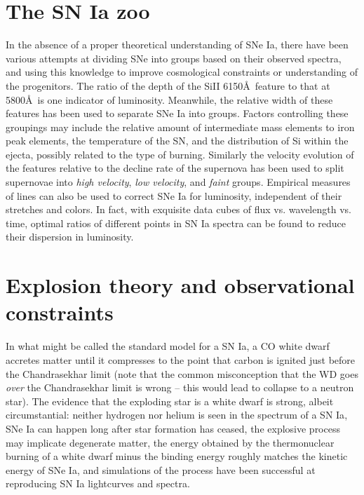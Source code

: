 \documentclass{nature1}
\begin{document}
\section{The SN Ia zoo}
In the absence of a proper theoretical understanding of SNe Ia, there
have been various attempts at dividing SNe into groups based on their
observed spectra, and using this knowledge to improve cosmological
constraints or understanding of the progenitors.  The ratio of the
depth of the SiII 6150\AA\ feature to that at 5800\AA\ is one
indicator of luminosity\citep{1995ApJ...455L.147N}.  Meanwhile, the
relative width of these features has been used to separate SNe Ia into
groups\citep{2009PASP..121..238B}.  Factors controlling these
groupings may include the relative amount of intermediate mass
elements to iron peak elements\citep{2007Sci...315..825M}, the
temperature of the SN\citep{1995ApJ...455L.147N}, and the distribution
of Si within the ejecta, possibly related to the type of
burning\citep{2009Natur.460..869K}.  Similarly the velocity evolution
of the features relative to the decline rate of the supernova has been
used to split supernovae into {\it high velocity}, {\it low velocity},
and {\it faint} groups\citep{2005ApJ...623.1011B}.  Empirical measures
of lines can also be used to correct SNe Ia for luminosity,
independent of their stretches and colors\citep{2008A&A...477..717B}.
In fact, with exquisite data cubes of flux vs. wavelength vs. time,
optimal ratios of different points in SN Ia spectra can be found to
reduce their dispersion in luminosity\citep{2009A&A...500L..17B}.

\section{Explosion theory and observational constraints}
In what might be called the standard model for a SN Ia, a CO white
dwarf accretes matter until it compresses to the point that carbon is
ignited just before the Chandrasekhar limit (note that the common
misconception that the WD goes {\it over} the Chandrasekhar limit is
wrong -- this would lead to collapse to a neutron star).  The evidence
that the exploding star is a white dwarf is strong, albeit
circumstantial\citep{2001sgrb.conf..334L}: neither hydrogen nor helium
is seen in the spectrum of a SN Ia\citep{2007ApJ...670.1275L}, SNe Ia
can happen long after star formation has ceased, the explosive process
may implicate degenerate matter, the energy obtained by the
thermonuclear burning of a white dwarf minus the binding energy
roughly matches the kinetic energy of SNe Ia, and simulations of the
process have been successful at reproducing SN Ia lightcurves and
spectra\citep{1984ApJ...286..644N,
  1991A&A...245..114K,1993A&A...270..223K, 2000ARA&A..38..191H,
  2007ApJ...656..661K}.
\end{document}
